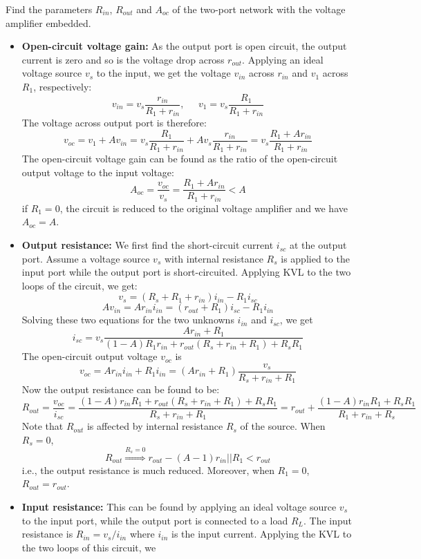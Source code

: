 Find the parameters $R_{in}$, $R_{out}$ and $A_{oc}$ of the two-port network
with the voltage amplifier embedded.
\begin{itemize}
\item {\bf Open-circuit voltage gain:} As the output port is open circuit, 
  the output current is zero and so is the voltage drop across $r_{out}$.
  Applying an ideal voltage source $v_s$ to the input, we get the voltage 
  $v_{in}$ across $r_{in}$ and $v_1$ across $R_1$, respectively:
  \[ v_{in}=v_s \frac{r_{in}}{R_1+r_{in}},\;\;\;\;\;
  v_1=v_s \frac{R_1}{R_1+r_{in}} \]
  The voltage across output port is therefore:
  \[ v_{oc}=v_1+A v_{in}=v_s \frac{R_1}{R_1+r_{in}}+Av_s\frac{r_{in}}{R_1+r_{in}}
  =v_s \frac{R_1+A r_{in}}{R_1+r_{in}}  \]
  The open-circuit voltage gain can be found as the ratio of the open-circuit
  output voltage to the input voltage:
  \[ A_{oc}=\frac{v_{oc}}{v_s}=\frac{R_1+A r_{in}}{R_1+r_{in}}<A  \]
  if $R_1=0$, the circuit is reduced to the original voltage amplifier and we
  have $A_{oc}=A$.
\item {\bf Output resistance:} We first find the short-circuit current $i_{sc}$ 
  at the output port. Assume a voltage source $v_s$ with internal resistance 
  $R_s$ is applied to the input port while the output port is short-circuited.
  Applying KVL to the two loops of the circuit, we get:
  \[ v_s=(R_s+R_1+r_{in})i_{in}-R_1 i_{sc} \]
  \[ A v_{in}=A r_{in} i_{in}=(r_{out}+R_1) i_{sc}-R_1 i_{in} \]
  Solving these two equations for the two unknowns $i_{in}$ and $i_{sc}$, we get
  \[ i_{sc}=v_s \frac{Ar_{in}+R_1}{(1-A)R_1 r_{in} +r_{out}(R_s+r_{in}+R_1)
    +R_sR_1} \]
  The open-circuit output voltage $v_{oc}$ is 
  \[ v_{oc}=Ar_{in}i_{in}+R_1i_{in}=(Ar_{in}+R_1)\frac{v_s}{R_s+r_{in}+R_1} \]
  Now the output resistance can be found to be:
  \[ R_{out}=\frac{v_{oc}}{i_{sc}}
  =\frac{(1-A)r_{in}R_1+r_{out}(R_s+r_{in}+R_1)+R_sR_1}{R_s+r_{in}+R_1}
  =r_{out}+\frac{(1-A) r_{in}R_1 +R_sR_1}{R_1+r_{in}+R_s}\]
  Note that $R_{out}$ is affected by internal resistance $R_s$ of the source.
  When $R_s=0$, 
  \[ R_{out}\stackrel{R_s=0}{\Longrightarrow} r_{out}-(A-1) r_{in}||R_1 < r_{out} \]
  i.e., the output resistance is much reduced. Moreover, when $R_1=0$, 
  $R_{out}=r_{out}$.
\item {\bf Input resistance:} This can be found by applying an ideal voltage
  source $v_s$ to the input port, while the output port is connected to a 
  load $R_L$. The input resistance is $R_{in}=v_s/i_{in}$ where $i_{in}$ is
  the input current. Applying the KVL to the two loops of this circuit, we

\end{itemize}
